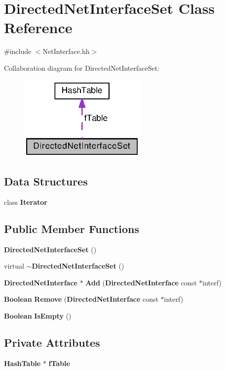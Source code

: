 \section{Directed\+Net\+Interface\+Set Class Reference}
\label{classDirectedNetInterfaceSet}


{\ttfamily \#include $<$Net\+Interface.\+hh$>$}



Collaboration diagram for Directed\+Net\+Interface\+Set\+:
\nopagebreak
\begin{figure}[H]
\begin{center}
\leavevmode
\includegraphics[width=177pt]{classDirectedNetInterfaceSet__coll__graph}
\end{center}
\end{figure}
\subsection*{Data Structures}
\begin{DoxyCompactItemize}
\item 
class {\bf Iterator}
\end{DoxyCompactItemize}
\subsection*{Public Member Functions}
\begin{DoxyCompactItemize}
\item 
{\bf Directed\+Net\+Interface\+Set} ()
\item 
virtual {\bf $\sim$\+Directed\+Net\+Interface\+Set} ()
\item 
{\bf Directed\+Net\+Interface} $\ast$ {\bf Add} ({\bf Directed\+Net\+Interface} const $\ast$interf)
\item 
{\bf Boolean} {\bf Remove} ({\bf Directed\+Net\+Interface} const $\ast$interf)
\item 
{\bf Boolean} {\bf Is\+Empty} ()
\end{DoxyCompactItemize}
\subsection*{Private Attributes}
\begin{DoxyCompactItemize}
\item 
{\bf Hash\+Table} $\ast$ {\bf f\+Table}
\end{DoxyCompactItemize}
